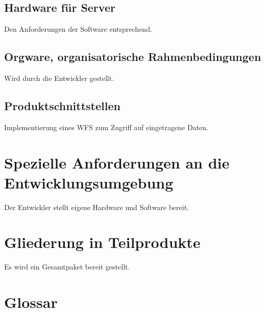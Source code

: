 \documentclass[a4paper,11pt]{scrartcl}
\begin{document}
	\subsection{Hardware für Server}
		Den Anforderungen der Software entsprechend.
	\subsection{Orgware, organisatorische Rahmenbedingungen}
		Wird durch die Entwickler gestellt.
	\subsection{Produktschnittstellen}
		Implementierung eines WFS zum Zugriff auf eingetragene Daten.
\section{Spezielle Anforderungen an die Entwicklungsumgebung}
	Der Entwickler stellt eigene Hardware und Software bereit.
\section{Gliederung in Teilprodukte}
	Es wird ein Gesamtpaket bereit gestellt.

\section{Glossar}
\end{document}
